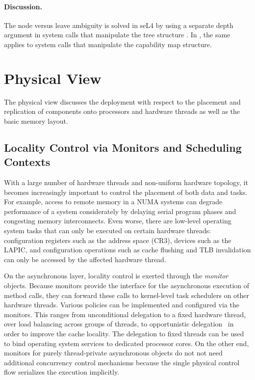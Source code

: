 \paragraph{Discussion.}
The node versus leave ambiguity is solved in seL4 by using a separate depth argument in system calls that manipulate the tree structure \cite{GrosvenorWalker2016}. In \mythos, the same applies to system calls that manipulate the capability map structure.


\section{Physical View}
\label{sec:global-physical-view}

The physical view discusses the deployment with respect to the placement and replication of components onto processors and hardware threads as well as the basic memory layout.

\subsection{Locality Control via Monitors and Scheduling Contexts}
\label{sec:locality-control}

With a large number of hardware threads and non-uniform hardware topology, it becomes increasingly important to  control the placement of both data and tasks.
For example, access to remote memory in a NUMA systems can degrade  performance of a system considerately by delaying serial program phases and congesting memory interconnects.
Even worse, there are low-level operating system tasks that can only be executed on certain hardware threads: configuration registers such as the address space (CR3), devices such as the LAPIC, and configuration operations such as cache flushing and TLB invalidation can only be accessed by the affected hardware thread.

On the asynchronous layer, locality control is exerted through the \emph{monitor} objects. Because monitors provide the interface for the asynchronous execution of method calls, they can forward these calls to kernel-level task schedulers on other hardware threads. Various policies can be implemented and configured via the monitors. This ranges from unconditional delegation to a fixed hardware thread, over load balancing across groups of threads, to opportunistic delegation~\cite{FatourouKallimanis2012} in order to improve the cache locality. The delegation to fixed threads can be used to bind operating system services to dedicated processor cores.
On the other end, monitors for purely thread-private asynchronous objects do not not need additional concurrency control mechanisms because the single physical control flow serializes the execution implicitly.

